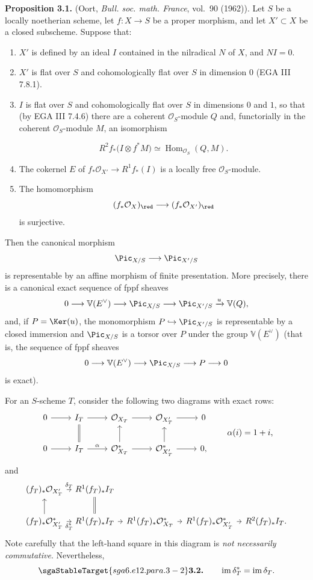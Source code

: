 \textbf{Proposition 3.1.} (Oort, \emph{Bull. soc. math. France}, vol.~90
(1962)). Let $S$ be a locally noetherian scheme, let $f:X\to S$ be a proper
morphism, and let $X'\subset X$ be a closed subscheme. Suppose that:
\begin{enumerate}[label=\roman*)]
\item $X'$ is defined by an ideal $I$ contained in the nilradical $N$ of
  $X$, and $NI=0$.
\item $X'$ is flat over $S$ and cohomologically flat over $S$ in dimension
  $0$ (EGA III 7.8.1).
\item $I$ is flat over $S$ and cohomologically flat over $S$ in dimensions
  $0$ and $1$, so that (by EGA III 7.4.6) there are a coherent
  $\mathcal O_S$-module $Q$ and, functorially in the coherent
  $\mathcal O_S$-module $M$, an isomorphism

\[
  R^2f_*\bigl(I\otimes f^*M\bigr)
  \simeq\operatorname{Hom}_{\mathcal O_S}(Q,M).
\]
\item The cokernel $E$ of
  $f_*\mathcal O_{X'}\to R^1f_*(I)$ is a locally free
  $\mathcal O_S$-module.
\item The homomorphism
  \[
    (f_*\mathcal O_X)_{\red}
    \longrightarrow(f_*\mathcal O_{X'})_{\red}
  \]
  is surjective.
\end{enumerate}
Then the canonical morphism
\[
  \Pic_{X/S}\longrightarrow\Pic_{X'/S}
\]
is representable by an affine morphism of finite presentation. More
precisely, there is a canonical exact sequence of fppf sheaves
\[
  0\longrightarrow\mathbb V(E^\vee)\longrightarrow\Pic_{X/S}
  \longrightarrow\Pic_{X'/S}\xrightarrow{u}\mathbb V(Q),
\]
and, if $P=\Ker(u)$, the monomorphism
$P\hookrightarrow\Pic_{X'/S}$ is representable by a closed immersion and
$\Pic_{X/S}$ is a torsor over $P$ under the group $\mathbb V(E^\vee)$
(that is, the sequence of fppf sheaves
\[
  0\longrightarrow\mathbb V(E^\vee)\longrightarrow\Pic_{X/S}
  \longrightarrow P\longrightarrow0
\]
is exact).

For an $S$-scheme $T$, consider the following two diagrams with exact rows:
\[
\begin{tikzcd}
0 \arrow[r] & I_T \arrow[r] & \mathcal O_{X_T} \arrow[r] &
  \mathcal O_{X'_T} \arrow[r] & 0\\
0 \arrow[r] & I_T \arrow[r,"\alpha"] \arrow[u,equal] &
  \mathcal O_{X_T}^{*} \arrow[r] \arrow[u] &
  \mathcal O_{X'_T}^{*} \arrow[r] \arrow[u] & 0,
\end{tikzcd}
\qquad \alpha(i)=1+i,
\]
and
\[
\begin{tikzcd}[column sep=tiny]
(f_T)_*\mathcal O_{X'_T} \arrow[r,"\delta_T"] &
  R^1(f_T)_*I_T \arrow[d,equal]\\
(f_T)_*\mathcal O_{X'_T}^{*} \arrow[r,"\delta_T^*"'] \arrow[u] &
  R^1(f_T)_*I_T \arrow[r] &
  R^1(f_T)_*\mathcal O_{X_T}^{*} \arrow[r] &
  R^1(f_T)_*\mathcal O_{X'_T}^{*} \arrow[r] &
  R^2(f_T)_*I_T.
\end{tikzcd}
\]
Note carefully that the left-hand square in this diagram is \emph{not
necessarily commutative}. Nevertheless,
\[
  \sgaStableTarget{sga6.e12.para.3-2}\textbf{3.2.}\qquad \operatorname{im}\delta_T^*
  =\operatorname{im}\delta_T.
\]

